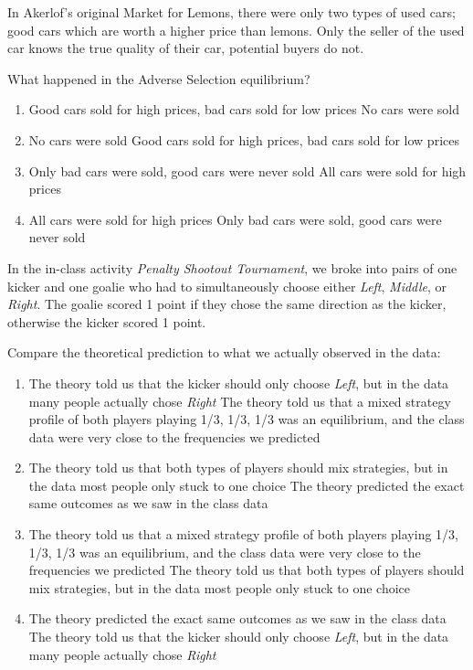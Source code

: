 \documentclass{article}
\begin{document}
\begin{question}[type=exam]{4}
  In Akerlof's original Market for Lemons, there were only two types of used cars; good cars which are worth a higher price than lemons.
  Only the seller of the used car knows the true quality of their car, potential buyers do not.

  What happened in the Adverse Selection equilibrium?
  \begin{enumerate}[label=\alph*), noitemsep]
    \item \vary
    {Good cars sold for high prices, bad cars sold for low prices}
    {No cars were sold}
    \item \vary
    {No cars were sold}
    {Good cars sold for high prices, bad cars sold for low prices}
    \item \vary
    {Only bad cars were sold, good cars were never sold} %
    {All cars were sold for high prices}
    \item \vary
    {All cars were sold for high prices}
    {Only bad cars were sold, good cars were never sold} %
  \end{enumerate}
\end{question}

\begin{question}[type=exam]{4}
  In the in-class activity \textit{Penalty Shootout Tournament}, 
  we broke into pairs of one kicker and one goalie who had to simultaneously choose either \textit{Left}, \textit{Middle}, or \textit{Right}.
  The goalie scored 1 point if they chose the same direction as the kicker, otherwise the kicker scored 1 point.

  Compare the theoretical prediction to what we actually observed in the data:
  \begin{enumerate}[label=\alph*), noitemsep]
    \item \vary
    {The theory told us that the kicker should only choose \textit{Left}, but in the data many people actually chose \textit{Right}}
    {The theory told us that a mixed strategy profile of both players playing 1/3, 1/3, 1/3 was an equilibrium, and the class data were very close to the frequencies we predicted} %
    \item \vary
    {The theory told us that both types of players should mix strategies, but in the data most people only stuck to one choice}
    {The theory predicted the exact same outcomes as we saw in the class data}
    \item \vary
    {The theory told us that a mixed strategy profile of both players playing 1/3, 1/3, 1/3 was an equilibrium, and the class data were very close to the frequencies we predicted} %
    {The theory told us that both types of players should mix strategies, but in the data most people only stuck to one choice}
    \item \vary
    {The theory predicted the exact same outcomes as we saw in the class data}
    {The theory told us that the kicker should only choose \textit{Left}, but in the data many people actually chose \textit{Right}}
  \end{enumerate}
\end{question}
\end{document}
